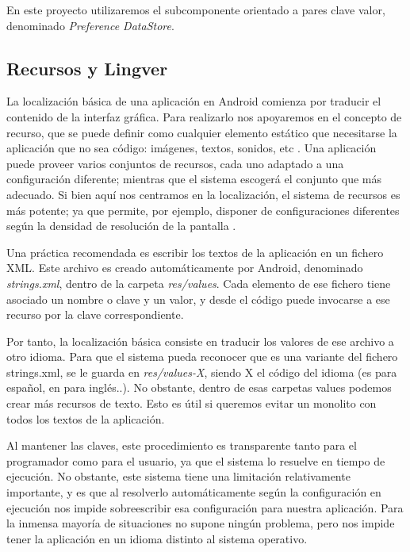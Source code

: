             En este proyecto utilizaremos el subcomponente orientado a pares clave valor, denominado \textit{Preference
            DataStore}.

        \subsection{Recursos y Lingver}
            La localización básica de una aplicación en Android comienza por traducir el contenido de la interfaz 
            gráfica. Para realizarlo nos apoyaremos en el concepto de recurso, que se puede definir como cualquier 
            elemento estático que necesitarse la aplicación que no sea código: imágenes, textos, sonidos, etc 
            \cite{noauthor_como_nodate-2}. Una 
            aplicación puede proveer varios conjuntos de recursos, cada uno adaptado a una configuración diferente;
            mientras que el sistema escogerá el conjunto que más adecuado. Si bien aquí nos centramos en la 
            localización, el sistema de recursos es más potente; ya que permite, por
            ejemplo, disponer de configuraciones diferentes según la densidad de resolución de la pantalla 
            \cite{noauthor_descripcion_nodate}.

            Una práctica recomendada es escribir los textos de la aplicación en un fichero XML. Este archivo es creado
            automáticamente por Android, denominado \textit{strings.xml}, dentro de la carpeta \textit{res/values}. 
            Cada elemento de ese fichero tiene asociado
            un nombre o clave y un valor, y desde el código puede invocarse a ese recurso por la clave correspondiente.

            Por tanto, la localización básica consiste en traducir los valores de ese archivo a otro idioma. Para que
            el sistema pueda reconocer que es una variante del fichero strings.xml, se le guarda en 
            \textit{res/values-X}, siendo X el código del idioma (es para español, en para inglés..). No obstante, 
            dentro de esas carpetas values podemos crear más recursos de texto. Esto es útil si queremos
            evitar un monolito con todos los textos de la aplicación.

            Al mantener las claves, este procedimiento es transparente tanto para el programador como para el usuario,
            ya que el sistema lo resuelve en tiempo de ejecución. No obstante, este sistema tiene una limitación
            relativamente importante, y es que al resolverlo automáticamente según la configuración en ejecución nos 
            impide sobreescribir esa configuración para nuestra aplicación. Para la inmensa mayoría de situaciones 
            no supone ningún problema, pero nos impide tener la aplicación en un idioma distinto al sistema operativo.

